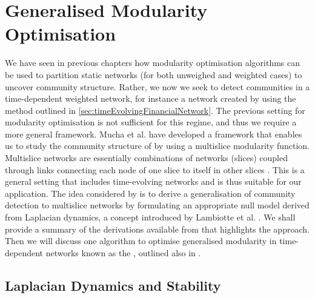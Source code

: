 
\section{Generalised Modularity Optimisation}
\label{sec:generalisedModularityOptimisation}

We have seen in previous chapters how modularity optimisation algorithms can be used to partition static networks (for both unweighed and weighted cases) to uncover community structure.
Rather, we now we seek to detect communities in a time-dependent weighted network, for instance a network created by using the method outlined in \cref{sec:timeEvolvingFinancialNetwork}.
The previous setting for modularity optimisation is not sufficient for this regime, and thus we require a more general framework.
Mucha et al. \cite{MRM+10} have developed a framework that enables us to study the community structure of  by using a multislice modularity function.
Multislice networks are essentially combinations of networks (slices) coupled through links connecting each node of one slice to itself in other slices \cite{MRM+10}.
This is a general setting that includes time-evolving networks and is thus suitable for our application.
The idea considered by \cite{MRM+10} is to derive a generalisation of community detection to multislice networks by formulating an appropriate null model derived from Laplacian dynamics, a concept introduced by Lambiotte et al. \cite{LDB08}.
We shall provide a summary of the derivations available from \cite{LDB08,Lam10,MRM+10} that highlights the approach.
Then we will discuss one algorithm to optimise generalised modularity in time-dependent networks known as the , outlined also in \cite{MRM+10,BPW+13}.


\subsection{Laplacian Dynamics and Stability}
\label{subsec:laplacianDynamicsAndStability}

